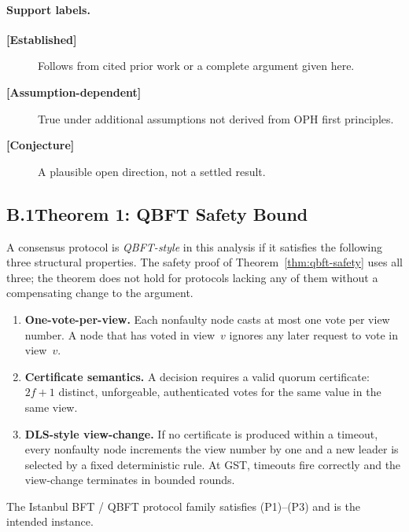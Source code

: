 \paragraph{Support labels.}
\begin{description}
  \item[\textbf{[Established]}] Follows from cited prior work or a complete
        argument given here.
  \item[\textbf{[Assumption-dependent]}] True under additional assumptions not
        derived from \textrm{OPH} first principles.
  \item[\textbf{[Conjecture]}] A plausible open direction, not a settled result.
\end{description}

\subsection*{B.1\quad Theorem 1: QBFT Safety Bound}

\begin{definition}
\label{def:qbft-style}
A consensus protocol is \emph{QBFT-style} in this analysis if it satisfies
the following three structural properties.
The safety proof of Theorem~\ref{thm:qbft-safety} uses all three;
the theorem does not hold for protocols lacking any of them without a
compensating change to the argument.
\begin{enumerate}[(P1)]
  \item \textbf{One-vote-per-view.}
        Each nonfaulty node casts at most one vote per view number.
        A node that has voted in view~$v$ ignores any later request
        to vote in view~$v$.
  \item \textbf{Certificate semantics.}
        A decision requires a valid quorum certificate: $2f+1$ distinct,
        unforgeable, authenticated votes for the same value in the same view.
  \item \textbf{DLS-style view-change.}
        If no certificate is produced within a timeout, every nonfaulty node
        increments the view number by one and a new leader is selected by a
        fixed deterministic rule.  At \textrm{GST}, timeouts fire correctly
        and the view-change terminates in bounded rounds.
\end{enumerate}
The Istanbul BFT / QBFT protocol family
\cite{Moniz2020,Saltini}
satisfies (P1)--(P3) and is the intended instance.
\end{definition}

